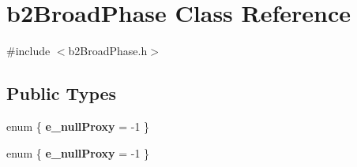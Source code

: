 \hypertarget{classb2BroadPhase}{}\section{b2\+Broad\+Phase Class Reference}
\label{classb2BroadPhase}


{\ttfamily \#include $<$b2\+Broad\+Phase.\+h$>$}

\subsection*{Public Types}
\begin{DoxyCompactItemize}
\item 
\mbox{\label{classb2BroadPhase_a8b47f59da4b34af73b401643bc88812b}} 
enum \{ {\bfseries e\+\_\+null\+Proxy} = -\/1
 \}
\item 
\mbox{\label{classb2BroadPhase_a721b527b53f35574f5573645d27dd826}} 
enum \{ {\bfseries e\+\_\+null\+Proxy} = -\/1
 \}
\end{DoxyCompactItemize}
